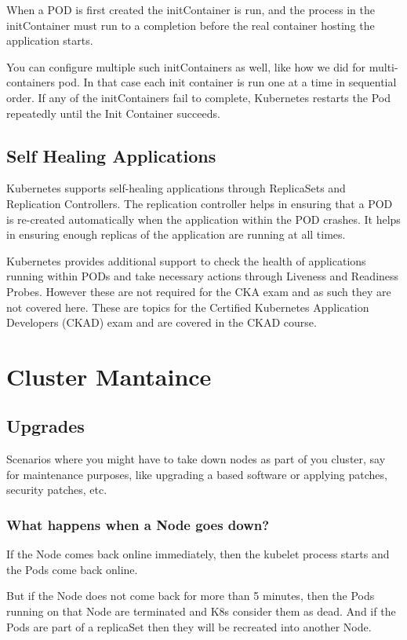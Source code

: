 \documentclass{article}
\begin{document}
When a POD is first created the initContainer is run, and the process in the initContainer must run to a completion before the real container hosting the application starts. 

You can configure multiple such initContainers as well, like how we did for multi-containers pod. In that case each init container is run one at a time in sequential order. If any of the initContainers fail to complete, Kubernetes restarts the Pod repeatedly until the Init Container succeeds.

\subsection{Self Healing Applications}

Kubernetes supports self-healing applications through ReplicaSets and Replication Controllers. The replication controller helps in ensuring that a POD is re-created automatically when the application within the POD crashes. It helps in ensuring enough replicas of the application are running at all times.

Kubernetes provides additional support to check the health of applications running within PODs and take necessary actions through Liveness and Readiness Probes. However these are not required for the CKA exam and as such they are not covered here. These are topics for the Certified Kubernetes Application Developers (CKAD) exam and are covered in the CKAD course.

\section{Cluster Mantaince}

\subsection{Upgrades}
Scenarios where you might have to take down nodes as part of you cluster, say for maintenance purposes, like upgrading a based software or applying patches, security patches, etc.

\subsubsection{What happens when a Node goes down?} 
If the Node comes back online immediately, then the kubelet process starts and the Pods come back online. 

But if the Node does not come back for more than 5 minutes, then the Pods running on that Node are terminated and K8s consider them as dead. And if the Pods are part of a replicaSet then they will be recreated into another Node.
\end{document}
